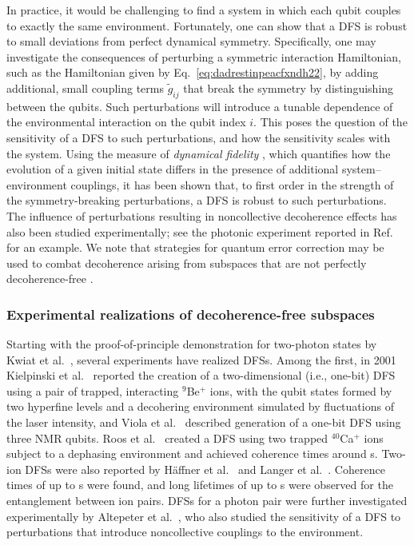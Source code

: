 \documentclass[3p,sort&compress]{elsarticle}
\begin{document}
In practice, it would be challenging to find a system in which each qubit couples to exactly the same environment. Fortunately, one can show that a DFS is robust to small deviations from perfect dynamical symmetry. Specifically, one may investigate the consequences of perturbing a symmetric interaction Hamiltonian, such as the Hamiltonian given by Eq.~\eqref{eq:dadrestinpeacfxndh22}, by adding additional, small coupling terms $\widetilde{g}_{ij}$ that break the symmetry by distinguishing between the qubits. Such perturbations will introduce a tunable dependence of the environmental interaction on the qubit index $i$. This poses the question of the sensitivity of a DFS to such perturbations, and how the sensitivity scales with the system. Using the measure of \emph{dynamical fidelity} \cite{Lidar:1998:uu,Bacon:1999:aq}, which quantifies how the evolution of a given initial state differs in the presence of additional system--environment couplings, it has been shown \cite{Lidar:1998:uu,Bacon:1999:aq,Kattemolle:2018:ii} that, to first order in the strength of the symmetry-breaking perturbations, a DFS is robust to such perturbations. The influence of perturbations resulting in noncollective decoherence effects has also been studied experimentally; see the photonic experiment reported in Ref.~\cite{Altepeter:2004:ll} for an example. We note that strategies for quantum error correction \cite{Steane:1996:cd,Shor:1995:rx,Steane:2001:dx,Knill:2002:rx,Nielsen:2000:tt,Lidar:2013:pp} may be used to combat decoherence arising from subspaces that are not perfectly decoherence-free \cite{Lidar:1999:fa}.

\subsubsection{Experimental realizations of decoherence-free subspaces}

Starting with the proof-of-principle demonstration for two-photon states by Kwiat et al.\ \cite{Kwiat:2000:kv}, several experiments have realized DFSs. Among the first, in 2001 Kielpinski et al.\ \cite{Kielpinski:2001:uu} reported the creation of a two-dimensional (i.e., one-bit) DFS using a pair of trapped, interacting $^9$Be$^+$ ions, with the qubit states formed by two hyperfine levels and a decohering environment simulated by fluctuations of the laser intensity, and Viola et al.\ \cite{Viola:2001:ra} described generation of a one-bit DFS using three NMR qubits. Roos et al.\ \cite{Roos:204:pp} created a DFS using two trapped $^{40}$Ca$^+$ ions subject to a dephasing environment and achieved coherence times around \unit[1]{s}. Two-ion DFSs were also reported by H{\"a}ffner et al.\ \cite{Haffner:2005:zz} and Langer et al.\ \cite{Langer:2005:uu}. Coherence times of up to \unit[34]{s} were found, and long lifetimes of up to \unit[20]{s} were observed for the entanglement between ion pairs. DFSs for a photon pair were further investigated experimentally by Altepeter et al.\ \cite{Altepeter:2004:ll}, who also studied the sensitivity of a DFS to perturbations that introduce noncollective couplings to the environment. 
\end{document}
